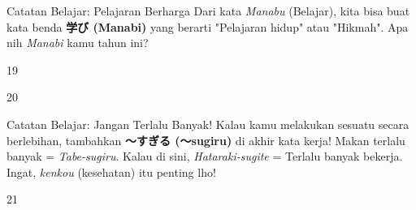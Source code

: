 \begin{lessonbox}{Catatan Belajar: Pelajaran Berharga}
    Dari kata \textit{Manabu} (Belajar), kita bisa buat kata benda \textbf{学び (Manabi)} yang berarti "Pelajaran hidup" atau "Hikmah". Apa nih \textit{Manabi} kamu tahun ini?
\end{lessonbox}

\begin{convobox}{19}
    \noindent
      

    \vspace{1.5em}
\end{convobox}

\begin{convobox}{20}
    \noindent
      
      

    \vspace{1.5em}
\end{convobox}

\begin{lessonbox}{Catatan Belajar: Jangan Terlalu Banyak!}
    Kalau kamu melakukan sesuatu secara berlebihan, tambahkan \textbf{〜すぎる (〜sugiru)} di akhir kata kerja! Makan terlalu banyak = \textit{Tabe-sugiru}. Kalau di sini, \textit{Hataraki-sugite} = Terlalu banyak bekerja. Ingat, \textit{kenkou} (kesehatan) itu penting lho!
\end{lessonbox}

\begin{convobox}{21}
    \noindent
      
      
     

    \vspace{1.5em}
\end{convobox}

